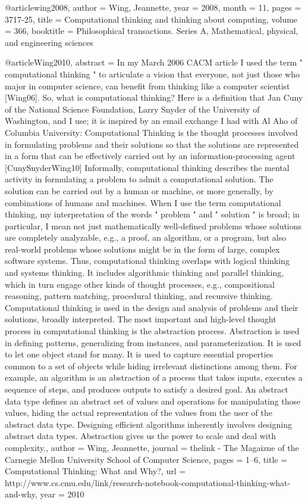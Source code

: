 @article{wing2008,
	author = {Wing, Jeannette},
	year = {2008},
	month = {11},
	pages = {3717-25},
	title = {Computational thinking and thinking about computing},
	volume = {366},
	booktitle = {Philosophical transactions. Series A, Mathematical, physical, and engineering sciences}
}



@article{Wing2010,
	abstract = {In my March 2006 CACM article I used the term " computational thinking " to articulate a vision that everyone, not just those who major in computer science, can benefit from thinking like a computer scientist [Wing06]. So, what is computational thinking? Here is a definition that Jan Cuny of the National Science Foundation, Larry Snyder of the University of Washington, and I use; it is inspired by an email exchange I had with Al Aho of Columbia University: Computational Thinking is the thought processes involved in formulating problems and their solutions so that the solutions are represented in a form that can be effectively carried out by an information-processing agent [CunySnyderWing10] Informally, computational thinking describes the mental activity in formulating a problem to admit a computational solution. The solution can be carried out by a human or machine, or more generally, by combinations of humans and machines. When I use the term computational thinking, my interpretation of the words " problem " and " solution " is broad; in particular, I mean not just mathematically well-defined problems whose solutions are completely analyzable, e.g., a proof, an algorithm, or a program, but also real-world problems whose solutions might be in the form of large, complex software systems. Thus, computational thinking overlaps with logical thinking and systems thinking. It includes algorithmic thinking and parallel thinking, which in turn engage other kinds of thought processes, e.g., compositional reasoning, pattern matching, procedural thinking, and recursive thinking. Computational thinking is used in the design and analysis of problems and their solutions, broadly interpreted. The most important and high-level thought process in computational thinking is the abstraction process. Abstraction is used in defining patterns, generalizing from instances, and parameterization. It is used to let one object stand for many. It is used to capture essential properties common to a set of objects while hiding irrelevant distinctions among them. For example, an algorithm is an abstraction of a process that takes inputs, executes a sequence of steps, and produces outputs to satisfy a desired goal. An abstract data type defines an abstract set of values and operations for manipulating those values, hiding the actual representation of the values from the user of the abstract data type. Designing efficient algorithms inherently involves designing abstract data types. Abstraction gives us the power to scale and deal with complexity.},
	author = {Wing, Jeannette},
	journal = {thelink - The Magaizne of the Carnegie Mellon University School of Computer Science},
	pages = {1--6},
	title = {{Computational Thinking: What and Why?}},
	url = {http://www.cs.cmu.edu/link/research-notebook-computational-thinking-what-and-why},
	year = {2010}
}

